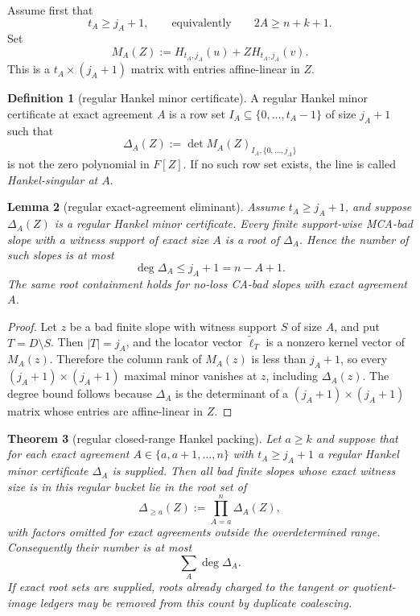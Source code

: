 \documentclass[11pt]{article}
\newtheorem{theorem}{Theorem}[section]
\newtheorem{lemma}[theorem]{Lemma}
\theoremstyle{definition}
\newtheorem{definition}[theorem]{Definition}
\theoremstyle{remark}
\begin{document}
Assume first that
\[
        t_A\ge j_A+1,
        \qquad\text{equivalently}\qquad
        2A\ge n+k+1 .
\]
Set
\[
        M_A(Z):=H_{t_A,j_A}(u)+Z H_{t_A,j_A}(v).
\]
This is a $t_A\times(j_A+1)$ matrix with entries affine-linear in $Z$.

\begin{definition}[regular Hankel minor certificate]
\label{def:hankel-regularity-certificate}
A regular Hankel minor certificate at exact agreement $A$ is a row set
$I_A\subseteq\{0,\ldots,t_A-1\}$ of size $j_A+1$ such that
\[
        \Delta_A(Z)
        :=\det M_A(Z)_{I_A,\{0,\ldots,j_A\}}
\]
is not the zero polynomial in $F[Z]$.  If no such row set exists, the line is
called \emph{Hankel-singular at $A$}.
\end{definition}

\begin{lemma}[regular exact-agreement eliminant]
\label{lem:regular-exact-agreement-eliminant}
Assume $t_A\ge j_A+1$, and suppose $\Delta_A(Z)$ is a regular Hankel minor
certificate.  Every finite support-wise MCA-bad slope with a witness support of
exact size $A$ is a root of $\Delta_A$.  Hence the number of such slopes is at
most
\[
        \deg\Delta_A\le j_A+1=n-A+1 .
\]
The same root containment holds for no-loss CA-bad slopes with exact agreement
$A$.
\end{lemma}

\begin{proof}
Let $z$ be a bad finite slope with witness support $S$ of size $A$, and put
$T=D\setminus S$.  Then $|T|=j_A$, and the locator vector
$\widetilde\ell_T$ is a nonzero kernel vector of $M_A(z)$.  Therefore the column
rank of $M_A(z)$ is less than $j_A+1$, so every $(j_A+1)\times(j_A+1)$ maximal
minor vanishes at $z$, including $\Delta_A(z)$.  The degree bound follows because
$\Delta_A$ is the determinant of a $(j_A+1)\times(j_A+1)$ matrix whose entries
are affine-linear in $Z$.
\end{proof}

\begin{theorem}[regular closed-range Hankel packing]
\label{thm:regular-closed-ball-hankel-packing}
Let $a\ge k$ and suppose that for each exact agreement
$A\in\{a,a+1,\ldots,n\}$ with $t_A\ge j_A+1$ a regular Hankel minor certificate
$\Delta_A$ is supplied.  Then all bad finite slopes whose exact witness size is
in this regular bucket lie in the root set of
\[
        \Delta_{\ge a}(Z):=\prod_{A=a}^{n}\Delta_A(Z),
\]
with factors omitted for exact agreements outside the overdetermined range.
Consequently their number is at most
\[
        \sum_A \deg\Delta_A .
\]
If exact root sets are supplied, roots already charged to the tangent or
quotient-image ledgers may be removed from this count by duplicate coalescing.
\end{theorem}
\end{document}
